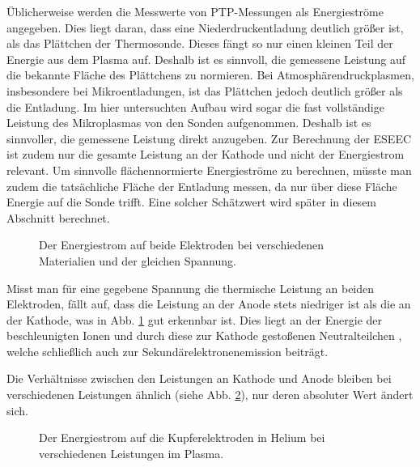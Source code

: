 Üblicherweise werden die Messwerte von PTP-Messungen als Energieströme angegeben. Dies liegt daran, dass eine Niederdruckentladung deutlich größer ist, als das Plättchen der Thermosonde. Dieses fängt so nur einen kleinen Teil der Energie aus dem Plasma auf. Deshalb ist es sinnvoll, die gemessene Leistung auf die bekannte Fläche des Plättchens zu normieren. Bei Atmosphärendruckplasmen, insbesondere bei Mikroentladungen, ist das Plättchen jedoch deutlich größer als die Entladung. Im hier untersuchten Aufbau wird sogar die fast vollständige Leistung des Mikroplasmas von den Sonden aufgenommen. Deshalb ist es sinnvoller, die gemessene Leistung direkt anzugeben. Zur Berechnung der ESEEC ist zudem nur die gesamte Leistung an der Kathode und nicht der Energiestrom relevant. Um sinnvolle flächennormierte Energieströme zu berechnen, müsste man zudem die tatsächliche Fläche der Entladung messen, da nur über diese Fläche Energie auf die Sonde trifft. Eine solcher Schätzwert wird später in diesem Abschnitt berechnet.
\begin{figure}[h]
	\centering
	
	\caption{Der Energiestrom auf beide Elektroden bei verschiedenen Materialien und der gleichen Spannung.}
	\label{fig:energiestrom}
\end{figure}

Misst man für eine gegebene Spannung die thermische Leistung an beiden Elektroden, fällt auf, dass die Leistung an der Anode stets niedriger ist als die an der Kathode, was in Abb. \ref{fig:energiestrom} gut erkennbar ist. Dies liegt an der Energie der beschleunigten Ionen und durch diese zur Kathode gestoßenen Neutralteilchen \cite{hansenConventionalNonconventionalDiagnostics2022}, welche schließlich auch zur Sekundärelektronenemission beiträgt.

Die Verhältnisse zwischen den Leistungen an Kathode und Anode bleiben bei verschiedenen Leistungen ähnlich (siehe Abb. \ref{fig:einzelleistungen}), nur deren absoluter Wert ändert sich.

\begin{figure}[H]
	\centering
	
	\caption{Der Energiestrom auf die Kupferelektroden in Helium bei verschiedenen Leistungen im Plasma.}
	\label{fig:einzelleistungen}
\end{figure}

